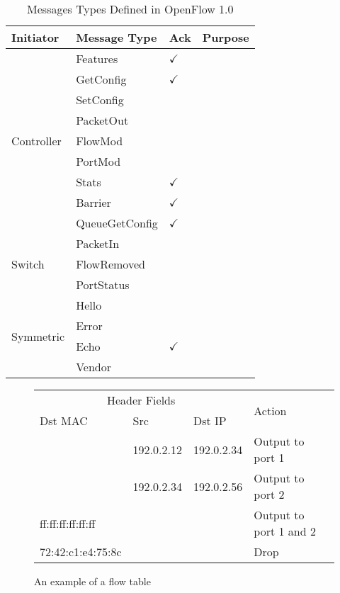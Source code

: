 \begin{table}
\centering
\caption{Messages Types Defined in OpenFlow 1.0}%
\begin{tabular}{llll}
\toprule
Initiator                   & Message Type   & Ack          & Purpose \\ \midrule
\multirow{9}{*}{Controller} & Features       & $\checkmark$ &         \\
                            & GetConfig      & $\checkmark$ &         \\
                            & SetConfig      &              &         \\
                            & PacketOut      &              &         \\
                            & FlowMod        &              &         \\
                            & PortMod        &              &         \\
                            & Stats          & $\checkmark$ &         \\
                            & Barrier        & $\checkmark$ &         \\
                            & QueueGetConfig & $\checkmark$ &         \\ \midrule
\multirow{3}{*}{Switch}     & PacketIn       &              &         \\
                            & FlowRemoved    &              &         \\
                            & PortStatus     &              &         \\ \midrule
\multirow{4}{*}{Symmetric}  & Hello          &              &         \\
                            & Error          &              &         \\
                            & Echo           & $\checkmark$ &         \\
                            & Vendor         &              &         \\ \bottomrule
\end{tabular}
\end{table}

\begin{figure}
\centering
\begin{tabular}{lllll}
\toprule
\multicolumn{3}{c}{Header Fields} & \multirow{2}{*}{Action} \\ \cmidrule(rl){1-3}
Dst MAC     & Src     & Dst IP    &                         \\ \midrule
                  & 192.0.2.12 & 192.0.2.34  & Output to port 1         \\
                  & 192.0.2.34 & 192.0.2.56  & Output to port 2         \\
ff:ff:ff:ff:ff:ff &            &             & Output to port 1 and 2   \\
72:42:c1:e4:75:8c &            &             & Drop                     \\
\bottomrule
\end{tabular}
\caption{An example of a flow table}%
\label{tbl:flow-table}
\end{figure}

